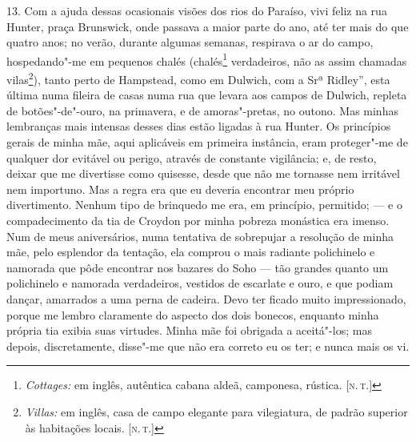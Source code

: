 13. Com a ajuda dessas ocasionais visões dos rios do Paraíso, vivi feliz
na rua Hunter, praça Brunswick, onde passava a maior parte do ano, até
ter mais do que quatro anos; no verão, durante algumas semanas,
respirava o ar do campo, hospedando"-me em pequenos chalés
(chalés\footnote{\emph{Cottages:} em inglês, autêntica cabana aldeã,
  camponesa, rústica. {[}\textsc{n.\,t.}{]}} verdadeiros, não as assim chamadas
vilas\footnote{\emph{Villas:} em inglês, casa de campo elegante para
  vilegiatura, de padrão superior às habitações locais. {[}\textsc{n.\,t.}{]}}),
tanto perto de Hampstead, como em Dulwich, com a Srª Ridley'', esta
última numa fileira de casas numa rua que levara aos campos de Dulwich,
repleta de botões"-de"-ouro, na primavera, e de amoras"-pretas, no outono.
Mas minhas lembranças mais intensas desses dias estão ligadas à rua
Hunter. Os princípios gerais de minha mãe, aqui aplicáveis em primeira
instância, eram proteger"-me de qualquer dor evitável ou perigo, através
de constante vigilância; e, de resto, deixar que me divertisse como
quisesse, desde que não me tornasse nem irritável nem importuno. Mas a
regra era que eu deveria encontrar meu próprio divertimento. Nenhum tipo
de brinquedo me era, em princípio, permitido; --- e o compadecimento da
tia de Croydon por minha pobreza monástica era imenso. Num de meus
aniversários, numa tentativa de sobrepujar a resolução de minha mãe,
pelo esplendor da tentação, ela comprou o mais radiante polichinelo e
namorada que pôde encontrar nos bazares do Soho --- tão grandes quanto um
polichinelo e namorada verdadeiros, vestidos de escarlate e ouro, e que
podiam dançar, amarrados a uma perna de cadeira. Devo ter ficado muito
impressionado, porque me lembro claramente do aspecto dos dois bonecos,
enquanto minha própria tia exibia suas virtudes. Minha mãe foi obrigada
a aceitá"-los; mas depois, discretamente, disse"-me que não era correto eu
os ter; e nunca mais os vi.

